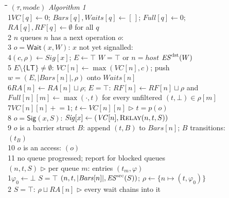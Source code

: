 \begin{figure}[tp]
\scriptsize
\begin{minipage}[t]{0.49\textwidth}
\begin{tabbing}
\quad\=\quad\=\quad\=\quad\=\quad\=\kill
{} $(\tau, \mathit{mode})$ \hfill \emph{Algorithm 1} \\
1\>$\mathit{VC}[q] \gets 0$; $\mathit{Bars}[q], \mathit{Waits}[q] \gets [\,]$; $\mathit{Full}[q] \gets 0$; $\mathit{RA}[q], \mathit{RF}[q] \gets \emptyset$ \quad for all $q$ \\
2\>  $n$  queues  $n$ has a next operation $o$: \\
3\>\> $o = \mathsf{Wait}(x,W)$:  $x$ not yet signalled:  \\
4\>\>\>$(c, \rho) \gets \mathit{Sig}[x]$; $E \gets \top$  $W{=}\top$ or $n{=}\mathit{host}$  $\mathit{ES}^{\mathrm{dst}}(W)$ \\
5\>\>\> $E \setminus \{\mathsf{LT}\} \ne \emptyset$: $\mathit{VC}[n] \gets \max(\mathit{VC}[n], c)$; push $w = (E, |\mathit{Bars}[n]|, \rho)$ onto $\mathit{Waits}[n]$ \\
6\>\>\>\>$\mathit{RA}[n] \gets \mathit{RA}[n] \sqcup \rho$;  $E = \top$: $\mathit{RF}[n] \gets \mathit{RF}[n] \sqcup \rho$ and \\
\>\>\>\>\>$\mathit{Full}[n][m] \gets \max(\cdot, t)$ for every unfiltered $(t, \bot) \in \rho[m]$ \\
7\>\>$\mathit{VC}[n][n] \mathrel{+}= 1$; $t \gets \mathit{VC}[n][n]$ \hfill $\triangleright$ $t = p(o)$ \\
8\>\> $o = \mathsf{Sig}(x,S)$: $\mathit{Sig}[x] \gets (\mathit{VC}[n], \textsc{Relay}(n, t, S))$ \\
9\>\> $o$ is a barrier struct $B$: append $(t,B)$ to $\mathit{Bars}[n]$;  $B$ transitions: $(t_B)$ \\
10\>\> $o$ is an access: $(o)$ \\
11\> no queue progressed; report  for blocked queues \\[3pt]
 $(n, t, S)$ \quad $\triangleright$ per queue $m$: entries $(t_m, \varphi)$ \\
1\>$\varphi_0 \gets \bot$  $S{=}\top$  $(n, t, |\mathit{Bars}[n]|, \mathit{ES}^{\mathrm{src}}(S))$; $\rho \gets \{n \mapsto (t, \varphi_0)\}$ \\
2\> $S = \top$:  $\rho \sqcup \mathit{RA}[n]$ \hfill $\triangleright$ every wait chains into it \\

\end{tabbing}
\end{minipage}
\end{figure}
